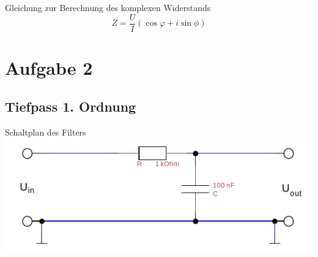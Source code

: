 \documentclass[compress,11pt]{beamer}
\begin{document}
\begin{frame}
Gleichung zur Berechnung des komplexen Widerstands
\begin{equation}
Z=\frac{U}{I}(\cos \varphi +i \sin \phi)
\end{equation}
\end{frame}

\section{Aufgabe 2}
\subsection{Tiefpass 1. Ordnung}
\begin{frame}
\begin{block}{Schaltplan des Filters}
\includegraphics[width=\textwidth]{../daten/Messdaten/plots/schalt_tief}
\end{block}
\end{frame}
\end{document}
